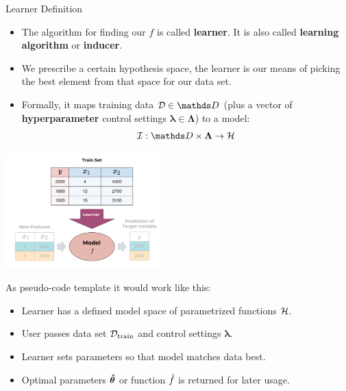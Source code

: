 \documentclass[11pt,compress,t,notes=noshow, xcolor=table]{beamer}
\begin{document}






\begin{vbframe}{Learner Definition}

\begin{itemize}

  \item The algorithm for finding our $f$ is called \textbf{learner}.
      It is also called \textbf{learning algorithm} or \textbf{inducer}.
  
  \item We prescribe a certain hypothesis space,
  the learner is our means of picking the best element from that space
  for our data set.

\item Formally, it maps training data $\D \in \allDatasets$ (plus a vector of \textbf{hyperparameter} control settings $\bm{\lambda} \in \bm{\Lambda}$) to a model:
\[\ind: \preimageInducerShort \rightarrow \Hspace\]

\end{itemize}
  \begin{center}
    \includegraphics[width = 0.45\textwidth]{figure_man/the_inducer_web.png}
  \end{center}

\framebreak
  
As pseudo-code template it would work like this:
\begin{itemize}
  \item Learner has a defined model space of parametrized functions $\mathcal{H}$.
  \item User passes data set $\mathcal{D}_{\text{train}}$ and control settings $\bm{\lambda}$.
  \item Learner sets parameters so that model 
    matches data best.
  \item Optimal parameters $\bm{\hat\theta}$ or function $\hat{f}$ is returned for later usage.


\end{itemize}
\end{vbframe}
\end{document}
